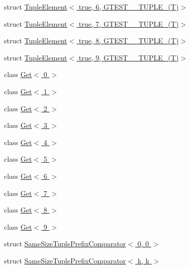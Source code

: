 \begin{DoxyCompactItemize}
\item 
struct \hyperlink{structstd_1_1tr1_1_1gtest__internal_1_1TupleElement_3_01true_00_016_00_01GTEST__10__TUPLE___07T_08_4}{\-Tuple\-Element$<$ true, 6, G\-T\-E\-S\-T\-\_\-\_\-\-T\-U\-P\-L\-E\-\_\-(\-T)$>$}
\item 
struct \hyperlink{structstd_1_1tr1_1_1gtest__internal_1_1TupleElement_3_01true_00_017_00_01GTEST__10__TUPLE___07T_08_4}{\-Tuple\-Element$<$ true, 7, G\-T\-E\-S\-T\-\_\-\_\-\-T\-U\-P\-L\-E\-\_\-(\-T)$>$}
\item 
struct \hyperlink{structstd_1_1tr1_1_1gtest__internal_1_1TupleElement_3_01true_00_018_00_01GTEST__10__TUPLE___07T_08_4}{\-Tuple\-Element$<$ true, 8, G\-T\-E\-S\-T\-\_\-\_\-\-T\-U\-P\-L\-E\-\_\-(\-T)$>$}
\item 
struct \hyperlink{structstd_1_1tr1_1_1gtest__internal_1_1TupleElement_3_01true_00_019_00_01GTEST__10__TUPLE___07T_08_4}{\-Tuple\-Element$<$ true, 9, G\-T\-E\-S\-T\-\_\-\_\-\-T\-U\-P\-L\-E\-\_\-(\-T)$>$}
\item 
class \hyperlink{classstd_1_1tr1_1_1gtest__internal_1_1Get_3_010_01_4}{\-Get$<$ 0 $>$}
\item 
class \hyperlink{classstd_1_1tr1_1_1gtest__internal_1_1Get_3_011_01_4}{\-Get$<$ 1 $>$}
\item 
class \hyperlink{classstd_1_1tr1_1_1gtest__internal_1_1Get_3_012_01_4}{\-Get$<$ 2 $>$}
\item 
class \hyperlink{classstd_1_1tr1_1_1gtest__internal_1_1Get_3_013_01_4}{\-Get$<$ 3 $>$}
\item 
class \hyperlink{classstd_1_1tr1_1_1gtest__internal_1_1Get_3_014_01_4}{\-Get$<$ 4 $>$}
\item 
class \hyperlink{classstd_1_1tr1_1_1gtest__internal_1_1Get_3_015_01_4}{\-Get$<$ 5 $>$}
\item 
class \hyperlink{classstd_1_1tr1_1_1gtest__internal_1_1Get_3_016_01_4}{\-Get$<$ 6 $>$}
\item 
class \hyperlink{classstd_1_1tr1_1_1gtest__internal_1_1Get_3_017_01_4}{\-Get$<$ 7 $>$}
\item 
class \hyperlink{classstd_1_1tr1_1_1gtest__internal_1_1Get_3_018_01_4}{\-Get$<$ 8 $>$}
\item 
class \hyperlink{classstd_1_1tr1_1_1gtest__internal_1_1Get_3_019_01_4}{\-Get$<$ 9 $>$}
\item 
struct \hyperlink{structstd_1_1tr1_1_1gtest__internal_1_1SameSizeTuplePrefixComparator_3_010_00_010_01_4}{\-Same\-Size\-Tuple\-Prefix\-Comparator$<$ 0, 0 $>$}
\item 
struct \hyperlink{structstd_1_1tr1_1_1gtest__internal_1_1SameSizeTuplePrefixComparator_3_01k_00_01k_01_4}{\-Same\-Size\-Tuple\-Prefix\-Comparator$<$ k, k $>$}
\end{DoxyCompactItemize}
